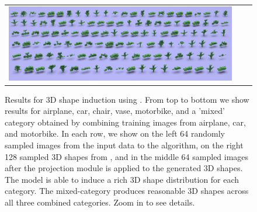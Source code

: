 \begin{figure}
\begin{center}
\begin{tabular}{ccc}
    \includegraphics[height=\fh]{fig/mix/output.png} \\
  \end{tabular}
  \end{center}
  \vspace{-6pt}
  \caption{\label{fig:generate-shapes} Results for 3D shape induction using \prgans. From top to bottom we show results for airplane, car, chair, vase, motorbike, and a 'mixed' category obtained by combining training images from airplane, car, and motorbike. In each row, we show on the left 64 randomly sampled images from the input data to the algorithm, on the right 128 sampled 3D shapes from \prgan, and in the middle 64 sampled images after the projection module is applied to the generated 3D shapes. The model is able to induce a rich 3D shape distribution for each category. The mixed-category produces reasonable 3D shapes across all three combined categories. Zoom in to see details.}
\end{figure}

